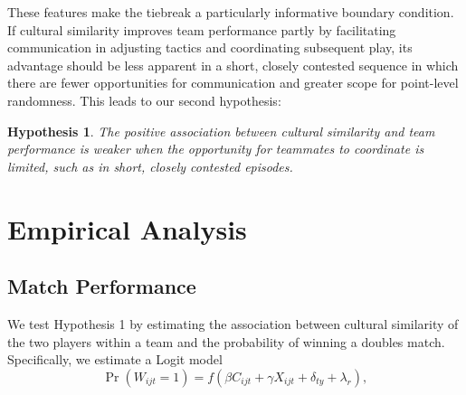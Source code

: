 \documentclass[10pt]{article}
\newtheorem{hypothesis}{Hypothesis}
\begin{document}
 These features make the tiebreak a particularly informative boundary condition. If cultural similarity improves team performance partly by facilitating communication in adjusting tactics and coordinating subsequent play, its advantage should be less apparent in a short, closely contested sequence in which there are fewer opportunities for communication and greater scope for point-level randomness. This leads to our second hypothesis:

\begin{hypothesis}
The positive association between cultural similarity and team performance is weaker when the opportunity for teammates to coordinate is limited, such as in short, closely contested episodes.
\end{hypothesis}

\section{Empirical Analysis}

\subsection{Match Performance}
We test Hypothesis 1 by  estimating the association between cultural similarity of the two players within a team and the probability of winning a doubles match. Specifically, we estimate a Logit model
\begin{equation}\label{matchoutcome}
  \operatorname{Pr}(W_{ijt} = 1) = f(\beta C_{ijt} + \gamma X_{ijt} + \delta_{ty} + \lambda_r) , 
\end{equation}
\end{document}

